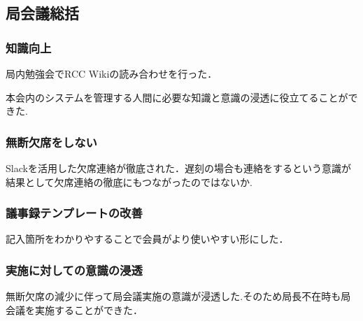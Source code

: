\subsection*{局会議総括}


\subsubsection*{知識向上}

局内勉強会でRCC Wikiの読み合わせを行った．

本会内のシステムを管理する人間に必要な知識と意識の浸透に役立てることができた.

\subsubsection*{無断欠席をしない}

Slackを活用した欠席連絡が徹底された．遅刻の場合も連絡をするという意識が結果として欠席連絡の徹底にもつながったのではないか.

\subsubsection*{議事録テンプレートの改善}

記入箇所をわかりやすることで会員がより使いやすい形にした．

\subsubsection*{実施に対しての意識の浸透}

無断欠席の減少に伴って局会議実施の意識が浸透した.そのため局長不在時も局会議を実施することができた．
